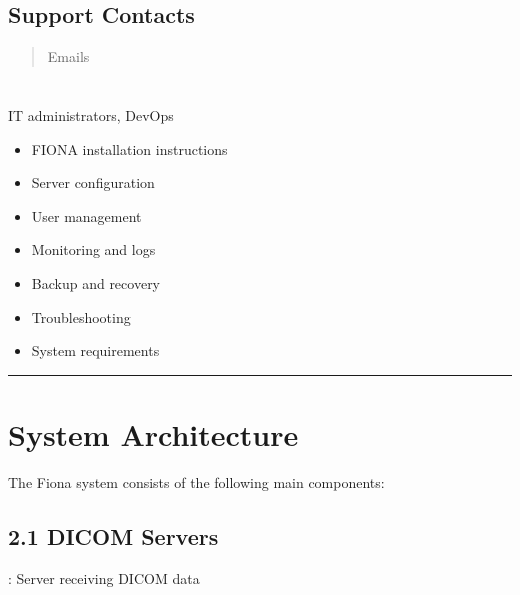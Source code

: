 \documentclass[letterpaper,10pt,english]{sphinxmanual}
\begin{document}
\subsection{Support Contacts}
\label{\detokenize{Temp/end-user-options:support-contacts}}\begin{quote}

\sphinxAtStartPar
Emails
\end{quote}

\sphinxstepscope


\section{}
\label{\detokenize{Temp/admin-options:admin-options}}\label{\detokenize{Temp/admin-options::doc}}
\sphinxAtStartPar
{} IT administrators, DevOps

\sphinxAtStartPar
{}
\begin{itemize}
\item {} 
\sphinxAtStartPar
FIONA installation instructions

\item {} 
\sphinxAtStartPar
Server configuration

\item {} 
\sphinxAtStartPar
User management

\item {} 
\sphinxAtStartPar
Monitoring and logs

\item {} 
\sphinxAtStartPar
Backup and recovery

\item {} 
\sphinxAtStartPar
Troubleshooting

\item {} 
\sphinxAtStartPar
System requirements

\end{itemize}


\bigskip\hrule\bigskip



\section{System Architecture}
\label{\detokenize{Temp/admin-options:system-architecture}}
\sphinxAtStartPar
The Fiona system consists of the following main components:


\subsection{2.1 DICOM Servers}
\label{\detokenize{Temp/admin-options:dicom-servers}}
\sphinxAtStartPar
{}: Server receiving DICOM data
\end{document}
